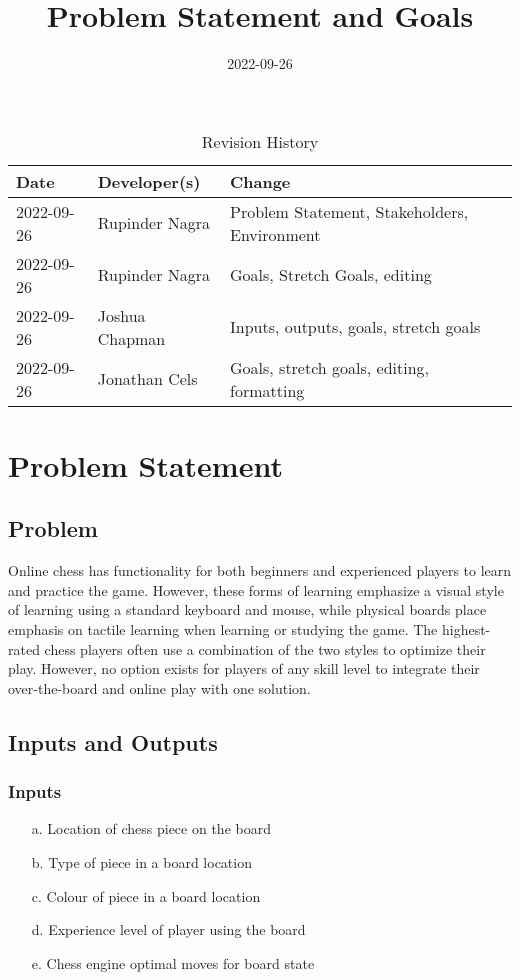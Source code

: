 \documentclass{article}
\title{Problem Statement and Goals\\\progname}
\author{\authname}
\date{2022-09-26}
\begin{document}
\maketitle

\begin{table}[hp]
\caption{Revision History} \label{TblRevisionHistory}
\begin{tabularx}{\textwidth}{llX}
\toprule
\textbf{Date} & \textbf{Developer(s)} & \textbf{Change}\\
\midrule
2022-09-26 & Rupinder Nagra & Problem Statement, Stakeholders, Environment\\
2022-09-26 & Rupinder Nagra & Goals, Stretch Goals, editing\\
2022-09-26 & Joshua Chapman & Inputs, outputs, goals, stretch goals\\
2022-09-26 & Jonathan Cels & Goals, stretch goals, editing, formatting\\
\bottomrule
\end{tabularx}
\end{table}

\section{Problem Statement}

\subsection{Problem}
{Online chess has functionality for both beginners and experienced players to learn and practice the game. 
However, these forms of learning emphasize a visual style of learning using a standard keyboard and mouse, while physical boards place emphasis on tactile learning when learning or studying the game.
The highest-rated chess players often use a combination of the two styles to optimize their play. However, no option exists for players of any skill level to integrate their over-the-board and online play with one solution.}

\medskip
{}

\subsection{Inputs and Outputs}

\subsubsection{Inputs}
\begin{enumerate}
    \item[a.] Location of chess piece on the board
    \item[b.] Type of piece in a board location
    \item[c.] Colour of piece in a board location
    \item[d.] Experience level of player using the board
    \item[e.] Chess engine optimal moves for board state
\end{enumerate}
\end{document}

